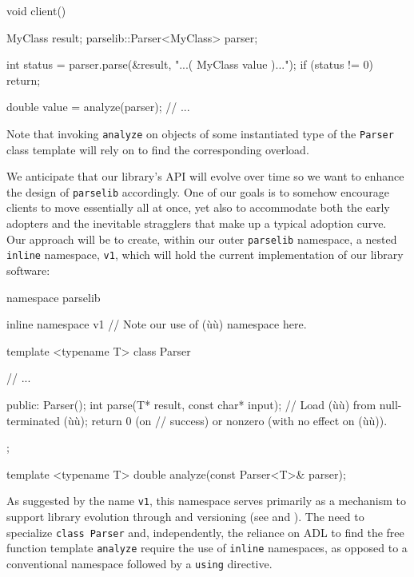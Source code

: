 \begin{emcppslisting}[emcppsbatch=e2]
void client()
{
    MyClass result;
    parselib::Parser<MyClass> parser;

    int status = parser.parse(&result, "...( MyClass value )...");
    if (status != 0)
    {
        return;
    }

    double value = analyze(parser);
    // ...
}
\end{emcppslisting}
    
\noindent Note that invoking \lstinline!analyze! on objects of some instantiated type
of the \lstinline!Parser! class template will rely on  to find
the corresponding overload.

We anticipate that our library's API will evolve over time so we want to
enhance the design of \lstinline!parselib! accordingly. One of our goals is
to somehow encourage clients to move essentially all at once, yet also to
accommodate both the early adopters and the inevitable stragglers that
make up a typical adoption curve. Our approach will be to create, within
our outer \lstinline!parselib! namespace, a nested \lstinline!inline!
namespace, \lstinline!v1!, which will hold the current implementation of
our library software:

\begin{emcppslisting}[emcppsbatch=e3]
namespace parselib
{
    inline namespace v1             // Note our use of (ù{}ù) namespace here.
    {
        template <typename T>
        class Parser
        {
            // ...

        public:
            Parser();
            int parse(T* result, const char* input);
                // Load (ù{}ù) from null-terminated (ù{}ù); return 0 (on
                // success) or nonzero (with no effect on (ù{}ù)).
        };

        template <typename T>
        double analyze(const Parser<T>& parser);
    }
}
\end{emcppslisting}
    
\noindent As suggested by the name \lstinline!v1!, this namespace serves primarily as
a mechanism to support library evolution through  and
 versioning (see  
and  ). 
The need to specialize \lstinline!class!~\lstinline!Parser! and,
independently, the reliance on ADL to find the free function template
\lstinline!analyze! require the use of \lstinline!inline! namespaces, as
opposed to a conventional namespace followed by a \lstinline!using!
directive.


